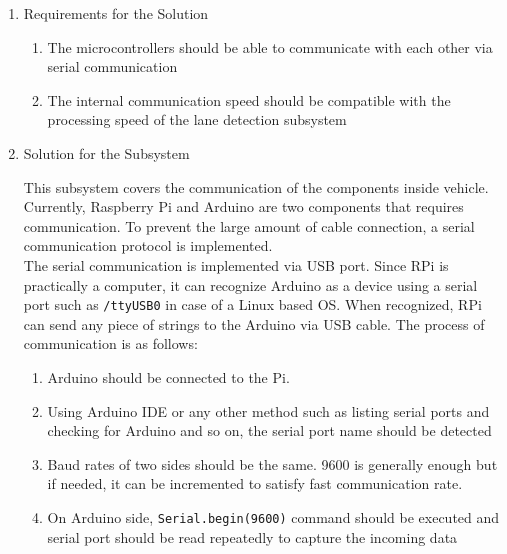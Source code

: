 \documentclass[a4paper,12pt]{article}
\begin{document}
\begin{enumerate}

\item {Requirements for the Solution}


\begin{enumerate}

\item The microcontrollers should be able to communicate with each other via serial communication

\item The internal communication speed should be compatible with the processing speed of the lane detection subsystem  

\end{enumerate}


\item {Solution for the Subsystem}


This subsystem covers the communication of the components inside vehicle. Currently, Raspberry Pi and Arduino are two components that requires communication. To prevent the large amount of cable connection, a serial communication protocol is implemented. \\


The serial communication is implemented via USB port. Since RPi is practically a computer, it can recognize Arduino as a device using a serial port such as \lstinline|/ttyUSB0| in case of a Linux based OS. When recognized, RPi can send any piece of strings to the Arduino via USB cable. The process of communication is as follows:

\begin{enumerate}

\item Arduino should be connected to the Pi. \vspace{-0.2cm}

\item Using Arduino IDE or any other method such as listing serial ports and checking for Arduino and so on, the serial port name should be detected \vspace{-0.2cm}

\item Baud rates of two sides should be the same. 9600 is generally enough but if needed, it can be incremented to satisfy fast communication rate. \vspace{-0.2cm}

\item On Arduino side, \texttt{Serial.begin(9600)} command should be executed and serial port should be read repeatedly to capture the incoming data \vspace{-0.2cm}


\end{enumerate}
\end{enumerate}
\end{document}

